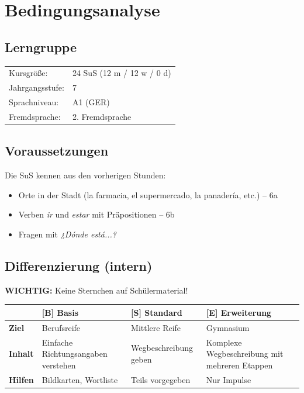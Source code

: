 \documentclass[11pt,a4paper]{article}
\newcommand{\jahrgangsstufe}{7}
\newcommand{\lerngruppengroesse}{24}
\newcommand{\maennlich}{12}
\newcommand{\weiblich}{12}
\newcommand{\divers}{0}
\newcommand{\gerniveau}{A1}
\begin{document}
\section{Bedingungsanalyse}

\subsection{Lerngruppe}
\begin{tabular}{ll}
    Kursgröße: & \lerngruppengroesse{} SuS (\maennlich{} m / \weiblich{} w / \divers{} d) \\
    Jahrgangsstufe: & \jahrgangsstufe \\
    Sprachniveau: & \gerniveau{} (GER) \\
    Fremdsprache: & 2. Fremdsprache \\
\end{tabular}

\subsection{Voraussetzungen}
Die SuS kennen aus den vorherigen Stunden:
\begin{itemize}
    \item Orte in der Stadt (la farmacia, el supermercado, la panadería, etc.) -- 6a
    \item Verben \textit{ir} und \textit{estar} mit Präpositionen -- 6b
    \item Fragen mit \textit{¿Dónde está...?}
\end{itemize}

\subsection{Differenzierung (intern)}

\textbf{WICHTIG:} Keine Sternchen auf Schülermaterial!

\begin{tabular}{|l|p{4cm}|p{4cm}|p{4cm}|}
\hline
& \textbf{[B] Basis} & \textbf{[S] Standard} & \textbf{[E] Erweiterung} \\
\hline
\textbf{Ziel} & Berufsreife & Mittlere Reife & Gymnasium \\
\hline
\textbf{Inhalt} & Einfache Richtungsangaben verstehen & Wegbeschreibung geben & Komplexe Wegbeschreibung mit mehreren Etappen \\
\hline
\textbf{Hilfen} & Bildkarten, Wortliste & Teils vorgegeben & Nur Impulse \\
\hline
\end{tabular}
\end{document}
